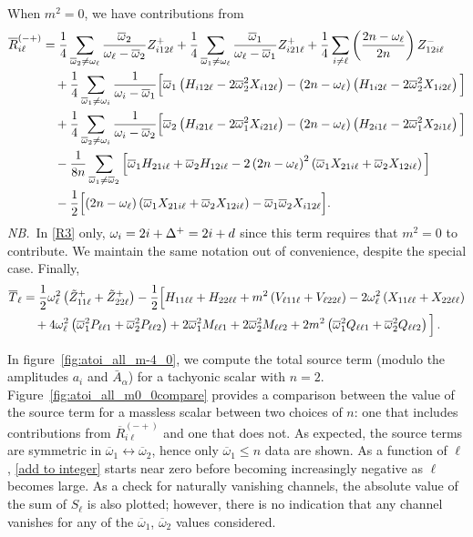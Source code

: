 \documentclass[../PhD.tex]{subfiles}
\newcommand{\oone}{\overline{\omega}_1}
\newcommand{\otwo}{\overline{\omega}_2}
\begin{document}
When $m^2 = 0$, we have contributions from
\begin{align}
\label{R3}
\overline{R}_{i\ell}^{(-+)} &=  \frac{1}{4} \sum_{\otwo \neq \ol} \frac{\otwo}{\ol - \otwo} Z^+_{i12\ell} + \frac{1}{4} \sum_{\oone \neq \ol} \frac{\oone}{\ol - \oone} Z^+_{i21\ell} + \frac{1}{4} \sum_{i \neq \ell} \left( \frac{2n - \ol}{2n} \right) Z^-_{12i\ell} \nonumber \\
%
& \quad + \frac{1}{4} \sum_{\oone \neq \oi} \frac{1}{\oi - \oone} \Big[ \oone \left( H_{i12\ell} - 2\otwo^2 X_{i12\ell} \right) - (2n - \ol) \left( H_{1i2\ell} - 2\otwo^2 X_{1i2\ell} \right) \Big] \nonumber \\
%
& \quad + \frac{1}{4} \sum_{\otwo \neq \oi} \frac{1}{\oi - \otwo} \Big[ \otwo \left( H_{i21\ell} - 2\oone^2 X_{i21\ell} \right) - (2n - \ol) \left( H_{2i1\ell} - 2\oone^2 X_{2i1\ell} \right) \Big] \nonumber \\
%
& \quad - \frac{1}{8n} \sum_{\oone \neq \otwo} \Big[ \oone H_{21i\ell} + \otwo H_{12i\ell} - 2 \left( 2n - \ol \right)^2 \left(\oone X_{21i\ell} + \otwo X_{12i\ell} \right) \Big] \nonumber \\
%
& \quad - \frac{1}{2} \Big[ (2n - \ol) \left( \oone X_{21i\ell} + \otwo X_{12i\ell} \right) - \oone \otwo X_{i12\ell} \Big] .
\end{align}
{\it NB.}\, In \eqref{R3} only, $\omega_i = 2i + \Delta^+ = 2i + d$ since this term requires that $m^2 = 0$ to contribute. We maintain the same notation out of convenience, despite the special case. Finally, 
\begin{align}
\label{T12}
\overline{T}_{\ell} &=  \frac{1}{2} \ol^2 \left( \tilde{Z}^+_{11\ell} + \tilde{Z}^+_{22\ell} \right)- \frac{1}{2} \Big[ H_{11\ell\ell} + H_{22\ell\ell} + m^2 \left( V_{\ell 1 1 \ell} + V_{\ell 2 2 \ell} \right) - 2 \ol^2 \left( X_{11\ell\ell} + X_{22\ell\ell} \right)  \nonumber \\
%
& \quad + 4 \ol^2 \left( \oone^2 P_{\ell \ell 1} + \otwo^2 P_{\ell \ell 2} \right) + 2\oone^2 M_{\ell \ell 1} + 2\otwo^2 M_{\ell \ell 2} + 2m^2 \left( \oone^2 Q_{\ell\ell 1} + \otwo^2 Q_{\ell \ell 2} \right) \Big] \, .
\end{align}

In figure~\ref{fig:atoi_all_m-4_0}, we compute the total source term (modulo the amplitudes $a_i$ and $\bar A_\alpha$) for a tachyonic scalar with $n = 2$. Figure~\ref{fig:atoi_all_m0_0compare} provides a comparison between the value of the source term for a massless scalar between two choices of $n$: one that includes contributions from $\overline{R}_{i\ell}^{(-+)}$ and one that does not. As expected, the source terms are symmetric in $\oone \leftrightarrow \otwo$, hence only $\oone \leq n$ data are shown. As a function of $\ell$, \eqref{add to integer} starts near zero before becoming increasingly negative as $\ell$ becomes large. As a check for naturally vanishing channels, the absolute value of the sum of $S_\ell$ is also plotted; however, there is no indication that any channel vanishes for any of the $\oone$, $\otwo$ values considered. 
\end{document}
